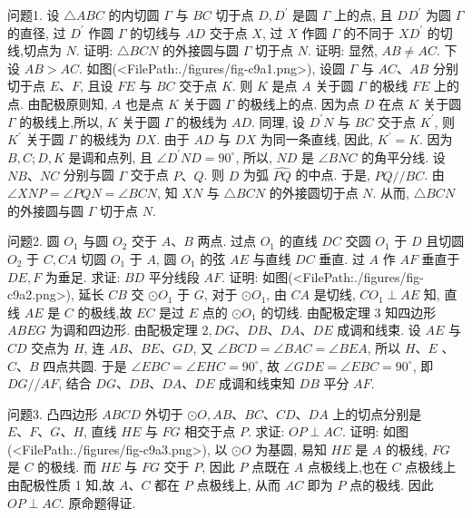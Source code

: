 
问题1. 设 $\triangle A B C$ 的内切圆 $\Gamma$ 与 $B C$ 切于点 $D, D^{\prime}$ 是圆 $\Gamma$ 上的点, 且 $D D^{\prime}$ 为圆 $\Gamma$ 的直径, 过 $D^{\prime}$ 作圆 $\Gamma$ 的切线与 $A D$ 交于点 $X$, 过 $X$ 作圆 $\Gamma$ 的不同于 $X D^{\prime}$ 的切线,切点为 $N$. 证明: $\triangle B C N$ 的外接圆与圆 $\Gamma$ 切于点 $N$.
证明: 显然, $A B \neq A C$. 下设 $A B> A C$. 如图(<FilePath:./figures/fig-c9a1.png>), 设圆 $\Gamma$ 与 $A C 、 A B$ 分别切于点 $E 、 F$, 且设 $F E$ 与 $B C$ 交于点 $K$. 则 $K$ 是点 $A$ 关于圆 $\Gamma$ 的极线 $F E$ 上的点.
由配极原则知, $A$ 也是点 $K$ 关于圆 $\Gamma$ 的极线上的点.
因为点 $D$ 在点 $K$ 关于圆 $\Gamma$ 的极线上,所以, $K$ 关于圆 $\Gamma$ 的极线为 $A D$. 同理, 设 $D^{\prime} N$ 与 $B C$ 交于点 $K^{\prime}$, 则 $K^{\prime}$ 关于圆 $\Gamma$ 的极线为 $D X$. 由于 $A D$
与 $D X$ 为同一条直线, 因此, $K^{\prime}=K$. 因为 $B, C ; D, K$ 是调和点列, 且 $\angle D^{\prime} N D=90^{\circ}$, 所以, $N D$ 是 $\angle B N C$ 的角平分线.
设 $N B 、 N C$ 分别与圆 $\Gamma$ 交于点 $P 、 Q$. 则 $D$ 为弧 $\widehat{P Q}$ 的中点.
于是, $P Q / / B C$. 由 $\angle X N P=\angle P Q N=\angle B C N$, 知 $X N$ 与 $\triangle B C N$ 的外接圆切于点 $N$. 从而, $\triangle B C N$ 的外接圆与圆 $\Gamma$ 切于点 $N$.



问题2. 圆 $O_1$ 与圆 $O_2$ 交于 $A 、 B$ 两点.
过点 $O_1$ 的直线 $D C$ 交圆 $O_1$ 于 $D$ 且切圆 $O_2$ 于 $C, C A$ 切圆 $O_1$ 于 $A$, 圆 $O_1$ 的弦 $A E$ 与直线 $D C$ 垂直.
过 $A$ 作 $A F$ 垂直于 $D E, F$ 为垂足.
求证: $B D$ 平分线段 $A F$.
证明: 如图(<FilePath:./figures/fig-c9a2.png>), 延长 $C B$ 交 $\odot O_1$ 于 $G$, 对于 $\odot O_1$, 由 $C A$ 是切线, $C O_1 \perp A E$ 知, 直线 $A E$ 是 $C$ 的极线,故 $E C$ 是过 $E$ 点的 $\odot O_1$ 的切线.
由配极定理 3 知四边形 $A B E G$ 为调和四边形.
由配极定理 $2, D G 、 D B 、 D A 、 D E$ 成调和线束.
设 $A E$ 与 $C D$ 交点为 $H$, 连 $A B 、 B E 、 G D$, 又 $\angle B C D=\angle B A C=\angle B E A$, 所以 $H 、 E$ 、 $C 、 B$ 四点共圆.
于是 $\angle E B C=\angle E H C=90^{\circ}$, 故 $\angle G D E=\angle E B C=90^{\circ}$, 即 $D G / / A F$, 结合
$D G 、 D B 、 D A 、 D E$ 成调和线束知 $D B$ 平分 $A F$.



问题3. 凸四边形 $A B C D$ 外切于 $\odot O, A B 、 B C 、 C D 、 D A$ 上的切点分别是 $E 、 F 、 G 、 H$, 直线 $H E$ 与 $F G$ 相交于点 $P$. 求证: $O P \perp A C$.
证明: 如图(<FilePath:./figures/fig-c9a3.png>), 以 $\odot O$ 为基圆, 易知 $H E$ 是 $A$ 的极线, $F G$ 是 $C$ 的极线.
而 $H E$ 与 $F G$ 交于 $P$, 因此 $P$ 点既在 $A$ 点极线上,也在 $C$ 点极线上由配极性质 1 知,故 $A 、 C$ 都在 $P$ 点极线上, 从而 $A C$ 即为 $P$ 点的极线.
因此 $O P \perp A C$. 原命题得证.



